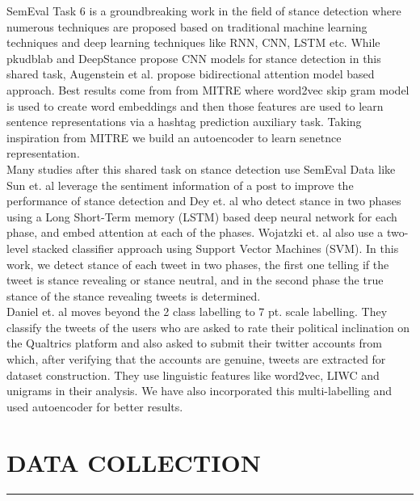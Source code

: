 \documentclass[a4paper,11pt]{article}
\begin{document}
SemEval Task 6\cite{mohammad2016semeval} is a groundbreaking work in the field of stance detection where numerous techniques are proposed based on traditional machine learning techniques and deep learning techniques like RNN, CNN, LSTM etc. While pkudblab \cite{wei2016pkudblab} and DeepStance\cite{vijayaraghavan2016deepstance} propose CNN models for stance detection in this shared task, Augenstein et al. \cite{augenstein2016stance} propose bidirectional attention model based approach. Best results come from from MITRE \cite{zarrella2016mitre} where word2vec skip gram model\cite{mikolov2013efficient} is used to create word embeddings and then those features are used to learn sentence representations via a hashtag prediction auxiliary task. Taking inspiration from MITRE\cite{zarrella2016mitre} we build an autoencoder to learn senetnce representation. \medskip\\
Many studies after this shared task on stance detection use SemEval Data like Sun et. al\cite{sun2019stance} leverage the sentiment information of a post to improve the performance of stance detection and Dey et. al\cite{dey2018topical} who detect stance in two phases using a Long Short-Term memory (LSTM) based deep neural network for each phase, and embed attention at each of the phases. Wojatzki et. al\cite{wojatzki2016ltl} also use a two-level stacked classifier approach using Support Vector Machines (SVM). In this work, we detect stance of each tweet in two phases, the first one telling if the tweet is stance revealing or stance neutral, and in the second phase the true stance of the stance revealing tweets is determined.\medskip\\
Daniel et. al \cite{preoctiuc2017beyond} moves beyond the 2 class labelling to 7 pt. scale labelling. They classify the tweets of the users who are asked to rate their political inclination on the Qualtrics platform and also asked to submit their twitter accounts from which, after verifying that the accounts are genuine, tweets are extracted for dataset construction. They use linguistic features like word2vec, LIWC and unigrams in their analysis. We have also incorporated this multi-labelling and used autoencoder for better results. 
\newpage

\section{DATA COLLECTION}
\hrule
\vspace*{5mm}
\end{document}
